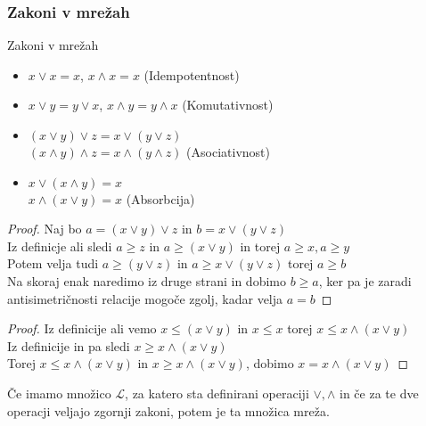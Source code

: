 \documentclass[slovene]{beamer}
\begin{document}
\begin{frame}
\frametitle{Zakoni v mrežah}
\begin{block}{Zakoni v mrežah}
\begin{itemize}
\item $x \lor x = x$, $x \land x = x$ (Idempotentnost)
\item $x \lor y = y \lor x$, $x \land y = y \land x$ (Komutativnost)
\item $(x \lor y) \lor z = x \lor (y \lor z)$\\ $(x \land y) \land z = x \land (y \land z)$ (Asociativnost)
\item $ x \lor (x \land y) = x$\\ $x \land (x \lor y) = x$ (Absorbcija)
\end{itemize}
\end{block}
\end{frame}


\begin{frame}
\begin{proof}
Naj bo $a = (x \lor y) \lor z$ in $b = x \lor (y \lor z)$ \\ \pause
Iz definicje ali sledi $a \geq z$ in $a \geq (x \lor y)$ in torej $a \geq x, a \geq y$ \\ \pause
Potem velja tudi $a \geq (y \lor z)$ in $a \geq x \lor (y \lor z)$ torej $a \geq b$\\ \pause
Na skoraj enak naredimo iz druge strani in dobimo $b \geq a$, ker pa je zaradi antisimetričnosti relacije mogoče zgolj, kadar velja $a=b$
\end{proof}
\end{frame}

\begin{frame}
\begin{proof}
Iz definicije ali vemo $x \leq (x \lor y)$ in $x \leq x$ torej $x \leq x \land (x \lor y)$\\ \pause
Iz definicije in pa sledi $x \geq x \land (x \lor y)$\\ \pause
Torej $x \leq x \land (x \lor y)$ in $x \geq x \land (x \lor y)$, dobimo $x = x \land (x \lor y)$

\end{proof}
\end{frame}


\begin{frame}
\begin{theorem}
Če imamo množico $\mathcal{L}$, za katero sta definirani operaciji $\lor, \land$ in če za te dve operacji veljajo zgornji zakoni, potem je ta množica mreža.
\end{theorem}
\end{frame}
\end{document}
